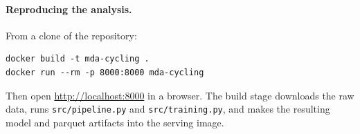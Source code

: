 \documentclass[11pt,a4paper]{article}
\begin{document}
\paragraph{Reproducing the analysis.}
From a clone of the repository:

\begin{verbatim}
docker build -t mda-cycling .
docker run --rm -p 8000:8000 mda-cycling
\end{verbatim}

\noindent Then open \url{http://localhost:8000} in a browser. The
build stage downloads the raw data, runs \texttt{src/pipeline.py} and
\texttt{src/training.py}, and makes the resulting model and parquet
artifacts into the serving image.
\end{document}
